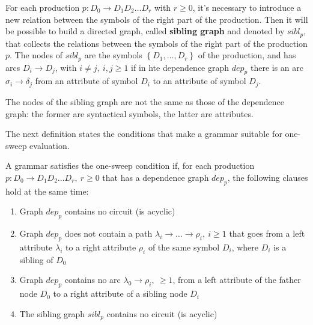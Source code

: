 \documentclass[english]{article}
\begin{document}
For each production \(p: D_0 \rightarrow D_1 D_2 \ldots D_r\) with \(r \geq 0\), it's necessary to introduce a new relation between the symbols of the right part of the production.
Then it will be possible to build a directed graph, called \textbf{sibling graph} and denoted by \(\textit{sibl}_p\), that collects the relations between the symbols of the right part of the production \(p\).
The nodes of \(\textit{sibl}_p\) are the symbols \(\left\{ D_1, \ldots, D_r \right\}\) of the production, and has arcs \(D_i \rightarrow D_j\), with \(i \neq j, \ i,j \geq 1\) if in hte dependence graph \(\textit{dep}_p\) there is an arc \(\sigma_i \rightarrow \delta_j\) from an attribute of symbol \(D_i\) to an attribute of symbol \(D_j\).

The nodes of the sibling graph are not the same as those of the dependence graph:
the former are syntactical symbols, the latter are attributes.

The next definition states the conditions that make a grammar suitable for one-sweep evaluation.

\begin{definition}
  \label{def:one-sweep-grammar-condition}
  A grammar satisfies the one-sweep condition if, for each production \(p : D_0 \rightarrow D_1 D_2 \ldots D_r, \ r \geq 0\) that has a dependence graph \(\textit{dep}_p\), the following clauses hold at the same time:

  \begin{enumerate}[label=\Alph*., ref=(\Alph*)]
    \item\label{enum:one-sweep-grammar-condition-1} Graph \(\textit{dep}_p\) contains no circuit (is acyclic)
    \item\label{enum:one-sweep-grammar-condition-2} Graph \(\textit{dep}_p\) does not contain a path \(\lambda_i \rightarrow \ldots \rightarrow \rho_i, \ i \geq 1\) that goes from a left attribute \(\lambda_i\) to a right attribute \(\rho_i\) of the same symbol \(D_i\), where \(D_i\) is a sibling of \(D_0\)
    \item\label{enum:one-sweep-grammar-condition-3} Graph \(\textit{dep}_p\) contains no arc \(\lambda_0 \rightarrow \rho_i, \ \geq 1\), from a left attribute of the father node \(D_0\) to a right attribute of a sibling node \(D_i\)
    \item\label{enum:one-sweep-grammar-condition-4} The sibling graph \(\textit{sibl}_p\) contains no circuit (is acyclic)
  \end{enumerate}
\end{definition}
\end{document}
